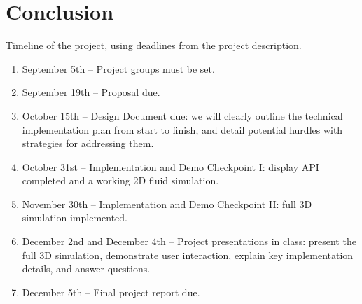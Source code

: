 \section{Conclusion}

Timeline of the project, using deadlines from the project description.  

\begin{enumerate}
    \item September 5th – Project groups must be set.
    \item September 19th – Proposal due.
    \item October 15th – Design Document due: we will clearly outline the technical implementation plan from start to finish, and detail potential hurdles with strategies for addressing them.
    \item October 31st – Implementation and Demo Checkpoint I: display API completed and a working 2D fluid simulation.
    \item November 30th – Implementation and Demo Checkpoint II: full 3D simulation implemented.
    \item December 2nd and December 4th – Project presentations in class: present the full 3D simulation, demonstrate user interaction, explain key implementation details, and answer questions.
    \item December 5th – Final project report due.
\end{enumerate}
